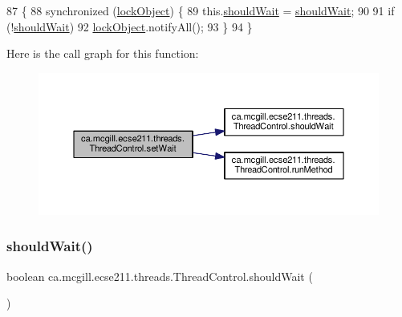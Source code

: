 \begin{DoxyCode}
87                                           \{
88     \textcolor{keyword}{synchronized} (\hyperlink{classca_1_1mcgill_1_1ecse211_1_1threads_1_1_thread_control_ab20c44ff2dafab8981c42fa8bf634dfc}{lockObject}) \{
89       this.\hyperlink{classca_1_1mcgill_1_1ecse211_1_1threads_1_1_thread_control_a9c3896500e86e402b8019e1be6500621}{shouldWait} = \hyperlink{classca_1_1mcgill_1_1ecse211_1_1threads_1_1_thread_control_a9c3896500e86e402b8019e1be6500621}{shouldWait};
90 
91       \textcolor{keywordflow}{if} (!\hyperlink{classca_1_1mcgill_1_1ecse211_1_1threads_1_1_thread_control_a9c3896500e86e402b8019e1be6500621}{shouldWait})
92         \hyperlink{classca_1_1mcgill_1_1ecse211_1_1threads_1_1_thread_control_ab20c44ff2dafab8981c42fa8bf634dfc}{lockObject}.notifyAll();
93     \}
94   \}
\end{DoxyCode}
Here is the call graph for this function\+:\nopagebreak
\begin{figure}[H]
\begin{center}
\leavevmode
\includegraphics[width=350pt]{classca_1_1mcgill_1_1ecse211_1_1threads_1_1_thread_control_a7759a6f52b56e15cb37cd25ea31c93c1_cgraph}
\end{center}
\end{figure}
\mbox{\label{classca_1_1mcgill_1_1ecse211_1_1threads_1_1_thread_control_a9c3896500e86e402b8019e1be6500621}} 
\subsubsection{\texorpdfstring{should\+Wait()}{shouldWait()}}
{\footnotesize\ttfamily boolean ca.\+mcgill.\+ecse211.\+threads.\+Thread\+Control.\+should\+Wait (\begin{DoxyParamCaption}{ }\end{DoxyParamCaption})}

